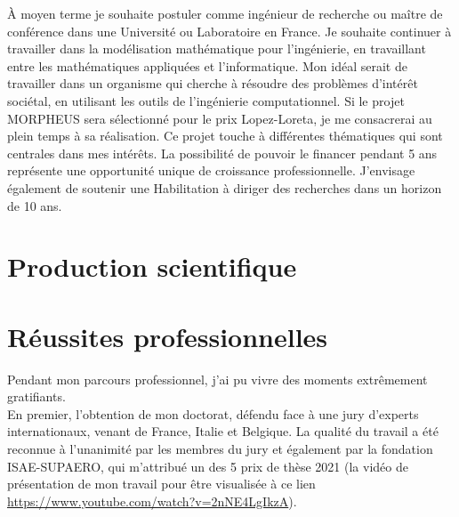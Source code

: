 \documentclass[12pt, french]{article}
\begin{document}
\`A moyen terme je souhaite postuler comme ingénieur de recherche ou maître de conférence dans une Université ou Laboratoire en France. Je souhaite continuer à travailler dans la modélisation mathématique pour l'ingénierie, en travaillant entre les mathématiques appliquées et l'informatique. Mon idéal serait de travailler dans un organisme qui cherche à résoudre des problèmes d'intérêt sociétal, en utilisant les outils de l'ingénierie computationnel.  Si le projet MORPHEUS sera sélectionné pour le prix Lopez-Loreta, je me consacrerai au plein temps à sa réalisation. Ce projet touche à différentes thématiques qui sont centrales dans mes intérêts. La possibilité de pouvoir le financer pendant 5 ans représente une opportunité unique de croissance professionnelle. J'envisage également de soutenir une Habilitation à diriger des recherches dans un horizon de 10 ans.


\section{Production scientifique}
{

 
}


\section{Réussites professionnelles}

Pendant mon parcours professionnel, j'ai pu vivre des moments extrêmement gratifiants. \\

En premier, l'obtention de mon doctorat, défendu face à une jury d'experts internationaux, venant de France, Italie et Belgique. La qualité du travail a été reconnue à l'unanimité par les membres du jury et également par la fondation ISAE-SUPAERO, qui m'attribué un des 5 prix de thèse 2021 (la vidéo de présentation de mon travail pour être visualisée à ce lien \url{https://www.youtube.com/watch?v=2nNE4LgIkzA}). \\
 
\end{document}
